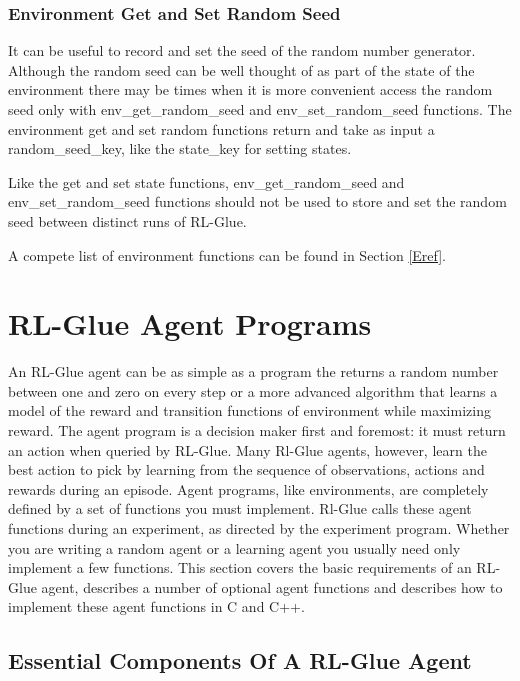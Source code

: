 \documentclass[11pt]{article}
\begin{document}
\subsubsection{Environment Get and Set Random Seed}
It can be useful to record and set the seed of the random number generator. Although the random seed can be well thought of as part of the state of the environment there may be times when it is more convenient access the random seed only with env\_get\_random\_seed and env\_set\_random\_seed functions. The environment get and set random functions return and take as input a random\_seed\_key, like the state\_key for setting states. 

Like the get and set state functions, env\_get\_random\_seed and env\_set\_random\_seed functions should not be used to store and set the random seed between distinct runs of RL-Glue.

A compete list of environment functions can be found in Section \ref{Eref}.










\section{RL-Glue Agent Programs}
\label{agent}
An RL-Glue agent can be as simple as a program the returns a random number between one and zero on every step or a more advanced algorithm that learns a model of the reward and transition functions of environment while maximizing reward. The agent program is a decision maker first and foremost: it must return an action when queried by RL-Glue. Many Rl-Glue agents, however, learn the best action to pick by learning from the sequence of observations, actions and rewards during an episode. Agent programs, like environments, are completely defined by a set of functions you must implement. Rl-Glue calls these agent functions during an experiment, as directed by the experiment program. Whether you are writing a random agent or a learning agent you usually need only implement a few functions. This section covers the basic requirements of an RL-Glue agent, describes a number of optional agent functions and describes how to implement these agent functions in C and C++.
\subsection{Essential Components Of A RL-Glue Agent}
\label{agentp1}
\end{document}
